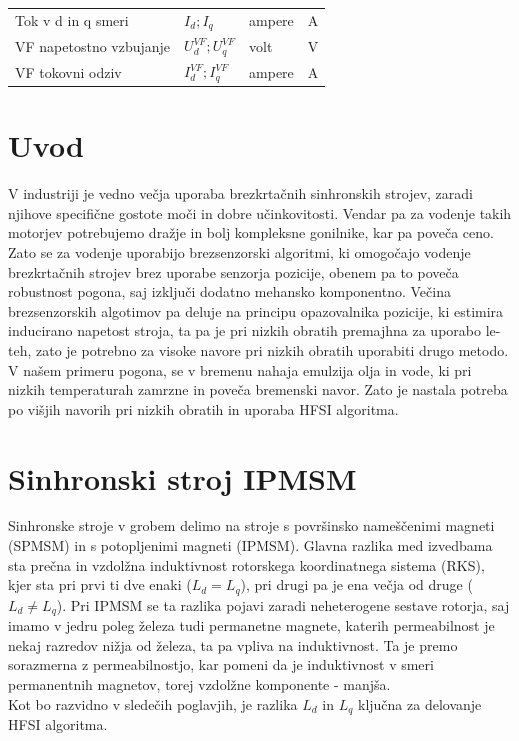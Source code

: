 \documentclass[a4paper,twoside,openright,12pt,slovene]{book}
\begin{document}
\begin{center}
\begin{tabular}{*{4}{l}}
        Tok v d in q smeri                                         & $I_{d}; I_{q}$                         & ampere               & A                      \\
        VF napetostno vzbujanje                                    & $U^{VF}_{d}; U^{VF}_{q}$               & volt                 & V                      \\
        VF tokovni odziv                                           & $I^{VF}_{d}; I^{VF}_{q}$               & ampere               & A                      \\
    \end{tabular}
\end{center}

\mainmatter

\chapter{Uvod} \label{uvod}

V industriji je vedno večja uporaba brezkrtačnih sinhronskih strojev, zaradi njihove specifične gostote moči in dobre učinkovitosti. Vendar pa za vodenje takih motorjev potrebujemo dražje in bolj
kompleksne gonilnike, kar pa poveča ceno. Zato se za vodenje uporabijo brezsenzorski algoritmi, ki omogočajo vodenje brezkrtačnih strojev brez uporabe senzorja pozicije, obenem pa to poveča robustnost
pogona, saj izključi dodatno mehansko komponentno. Večina brezsenzorskih algotimov pa deluje na principu opazovalnika pozicije, ki estimira inducirano napetost stroja, ta pa je pri nizkih obratih
premajhna za uporabo le-teh, zato je potrebno za visoke navore pri nizkih obratih uporabiti drugo metodo. V našem primeru pogona, se v bremenu nahaja emulzija olja in vode, ki pri nizkih temperaturah
zamrzne in poveča bremenski navor. Zato je nastala potreba po višjih navorih pri nizkih obratih in uporaba HFSI algoritma.



\chapter{Sinhronski stroj IPMSM} \label{sinhronskiStroj}

Sinhronske stroje v grobem delimo na stroje s površinsko nameščenimi magneti (SPMSM) in s potopljenimi magneti (IPMSM). Glavna razlika med izvedbama sta prečna in vzdolžna induktivnost rotorskega
koordinatnega sistema (RKS), kjer sta pri prvi ti dve enaki ($L_d = L_q$), pri drugi pa je ena večja od druge ($L_d \neq L_q$). Pri IPMSM se ta razlika pojavi zaradi neheterogene sestave rotorja, saj
imamo v jedru poleg železa tudi permanetne magnete, katerih permeabilnost je nekaj razredov nižja od železa, ta pa vpliva na induktivnost. Ta je premo sorazmerna z permeabilnostjo, kar pomeni da je
induktivnost v smeri permanentnih magnetov, torej vzdolžne komponente - manjša. \\
Kot bo razvidno v sledečih poglavjih, je razlika $L_d$ in $L_q$ ključna za delovanje HFSI algoritma. 
\end{document}
